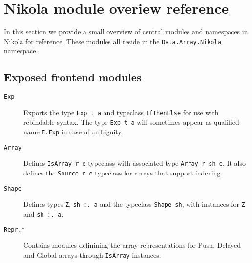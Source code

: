 \section{Nikola module overiew reference} \label{section:nikola-reference}

In this section we provide a small overview of central modules and namespaces
in Nikola for reference. These modules all reside in the
\texttt{Data.Array.Nikola} namespace.

\subsection{Exposed frontend modules}
\begin{description}

  \item[\texttt{Exp}] Exports the type \texttt{Exp t a} and typeclass
    \texttt{IfThenElse} for use with rebindable syntax. The type \texttt{Exp t
    a} will sometimes appear as qualified name \texttt{E.Exp} in case of
    ambiguity.

  \item[\texttt{Array}] Defines \texttt{IsArray r e} typeclass with
    associated type \texttt{Array r sh e}. It also defines the
    \texttt{Source r e} typeclass for arrays that support indexing.

  \item[\texttt{Shape}] Defines types \texttt{Z}, \texttt{sh :. a}
    and the typeclass \texttt{Shape sh}, with instances for \texttt{Z} and
    \texttt{sh :. a}.

  \item[\texttt{Repr.*}] Contains modules definining the array
    representations for Push, Delayed and Global arrays through
    \texttt{IsArray} instances.

\end{description}

